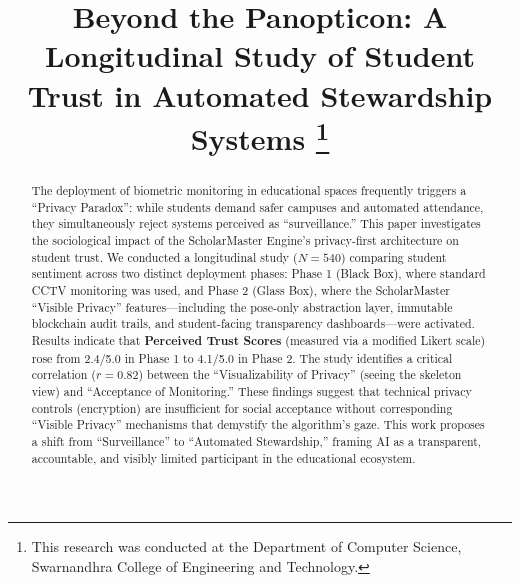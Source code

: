 \documentclass[conference]{IEEEtran}
\begin{document}
\title{Beyond the Panopticon: A Longitudinal Study of Student Trust in Automated Stewardship Systems
\thanks{This research was conducted at the Department of Computer Science, Swarnandhra College of Engineering and Technology.}
}

\author{
}

\maketitle

\begin{abstract}
The deployment of biometric monitoring in educational spaces frequently triggers a ``Privacy Paradox'': while students demand safer campuses and automated attendance, they simultaneously reject systems perceived as ``surveillance.'' This paper investigates the sociological impact of the ScholarMaster Engine's privacy-first architecture on student trust. We conducted a longitudinal study ($N=540$) comparing student sentiment across two distinct deployment phases: Phase 1 (Black Box), where standard CCTV monitoring was used, and Phase 2 (Glass Box), where the ScholarMaster ``Visible Privacy'' features---including the pose-only abstraction layer, immutable blockchain audit trails, and student-facing transparency dashboards---were activated. Results indicate that \textbf{Perceived Trust Scores} (measured via a modified Likert scale) rose from 2.4/5.0 in Phase 1 to 4.1/5.0 in Phase 2. The study identifies a critical correlation ($r=0.82$) between the ``Visualizability of Privacy'' (seeing the skeleton view) and ``Acceptance of Monitoring.'' These findings suggest that technical privacy controls (encryption) are insufficient for social acceptance without corresponding ``Visible Privacy'' mechanisms that demystify the algorithm's gaze. This work proposes a shift from ``Surveillance'' to ``Automated Stewardship,'' framing AI as a transparent, accountable, and visibly limited participant in the educational ecosystem.
\end{abstract}
\end{document}
